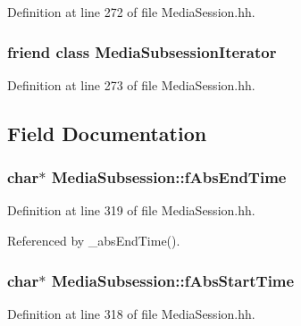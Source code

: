 Definition at line 272 of file Media\+Session.\+hh.

\subsubsection[{Media\+Subsession\+Iterator}]{\setlength{\rightskip}{0pt plus 5cm}friend class {\bf Media\+Subsession\+Iterator}\hspace{0.3cm}{\ttfamily [friend]}}\label{classMediaSubsession_aebc74a573f438ed4f3f732c0396023f9}


Definition at line 273 of file Media\+Session.\+hh.



\subsection{Field Documentation}
\subsubsection[{f\+Abs\+End\+Time}]{\setlength{\rightskip}{0pt plus 5cm}char$\ast$ Media\+Subsession\+::f\+Abs\+End\+Time\hspace{0.3cm}{\ttfamily [protected]}}\label{classMediaSubsession_a0d0302ad2affbad9f133049a6fd196b0}


Definition at line 319 of file Media\+Session.\+hh.



Referenced by \+\_\+abs\+End\+Time().

\subsubsection[{f\+Abs\+Start\+Time}]{\setlength{\rightskip}{0pt plus 5cm}char$\ast$ Media\+Subsession\+::f\+Abs\+Start\+Time\hspace{0.3cm}{\ttfamily [protected]}}\label{classMediaSubsession_a4989c04cd57f5e8c698c7a8f3ed8302e}


Definition at line 318 of file Media\+Session.\+hh.



